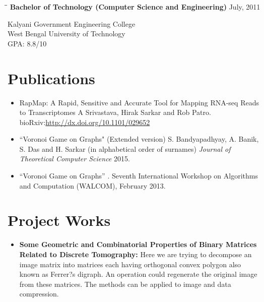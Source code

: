 \documentclass{res}
\begin{document}
\begin{resume}
\vspace{-0.1in}	
\begin{tabbing}
\hspace{2.3in}\= \hspace{2.6in}\= \kill %
{\bf Bachelor of Technology (Computer Science and Engineering)}  \>     \>July, 2011
\end{tabbing}  \vspace{-20pt}      %
Kalyani Government Engineering College \\
West Bengal University of Technology     \\       
GPA: 8.8/10      \\   



\section{Publications}
\begin{itemize}
\item{\color{blue}RapMap: A Rapid, Sensitive and Accurate Tool for Mapping RNA-seq Reads to Transcriptomes} A Srivastava, Hirak Sarkar and Rob Patro.  bioRxiv:\url{http://dx.doi.org/10.1101/029652}
\item {\color{blue}``Voronoi Game on Graphs"} (Extended version) S. Bandyapadhyay, A. Banik, S. Das and H. Sarkar (in alphabetical order of surnames) {\it Journal of Theoretical Computer Science} 2015.
\item {\color{blue}``Voronoi Game on Graphs''} . Seventh International Workshop on Algorithms and Computation (WALCOM), February 2013.
\end{itemize}


\section{Project Works}
\begin{itemize}
 
 
 \item {\bf Some Geometric and Combinatorial Properties of Binary Matrices Related to
Discrete Tomography:}
 Here we are trying to decompose an image matrix into matrices
each having orthogonal convex polygon also known as Ferrer?s digraph. An operation could
regenerate the original image from these matrices. The methods can be applied to image and
data compression.  


\end{itemize}
\end{resume}
\end{document}
